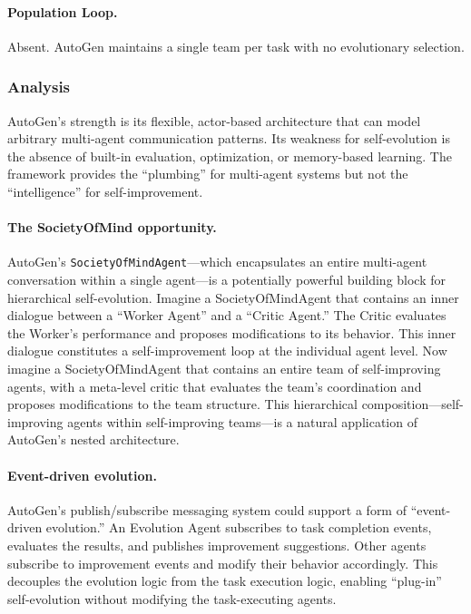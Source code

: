 \paragraph{Population Loop.}
Absent. AutoGen maintains a single team per task with no evolutionary selection.

\subsubsection{Analysis}

AutoGen's strength is its flexible, actor-based architecture that can model arbitrary multi-agent communication patterns. Its weakness for self-evolution is the absence of built-in evaluation, optimization, or memory-based learning. The framework provides the ``plumbing'' for multi-agent systems but not the ``intelligence'' for self-improvement.

\paragraph{The SocietyOfMind opportunity.}
AutoGen's \texttt{SocietyOfMindAgent}---which encapsulates an entire multi-agent conversation within a single agent---is a potentially powerful building block for hierarchical self-evolution. Imagine a SocietyOfMindAgent that contains an inner dialogue between a ``Worker Agent'' and a ``Critic Agent.'' The Critic evaluates the Worker's performance and proposes modifications to its behavior. This inner dialogue constitutes a self-improvement loop at the individual agent level. Now imagine a SocietyOfMindAgent that contains an entire team of self-improving agents, with a meta-level critic that evaluates the team's coordination and proposes modifications to the team structure. This hierarchical composition---self-improving agents within self-improving teams---is a natural application of AutoGen's nested architecture.

\paragraph{Event-driven evolution.}
AutoGen's publish/subscribe messaging system could support a form of ``event-driven evolution.'' An Evolution Agent subscribes to task completion events, evaluates the results, and publishes improvement suggestions. Other agents subscribe to improvement events and modify their behavior accordingly. This decouples the evolution logic from the task execution logic, enabling ``plug-in'' self-evolution without modifying the task-executing agents.


